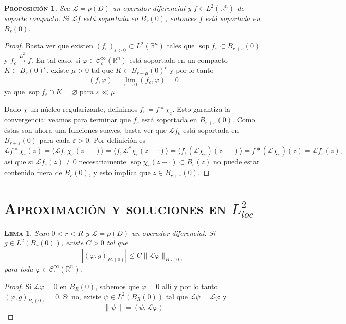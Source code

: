 \documentclass[11pt]{article}
\theoremstyle{colored}
\DeclareMathOperator{\sop}{sop}
\newtheorem{proposition}{\scshape Proposición}
\newtheorem{lemma}{\scshape Lema}
\newcommand{\R}{\mathbb{R}}
\newcommand{\C}{\mathscr{C}}
\newcommand{\eps}{\varepsilon}
\newcommand{\ev}[1]{\langle #1 \rangle}
\renewcommand{\L}{\mathscr{L}}
\begin{document}
\begin{proposition}Sea $\L = p(D)$ un operador diferencial y $f \in L^2(\R^n)$ de soporte compacto. Si $\L f$ está soportada en $B_r(0)$, entonces $f$ está soportada en $B_r(0)$.
\end{proposition}
\begin{proof} Basta ver que existen $(f_\eps)_{\eps > 0} \subset L^2(\R^n)$ tales que $\sop f_\eps \subset B_{r+\eps}(0)$ y $f_\eps \xrightarrow{L^2} f$. En tal caso, si $\varphi \in \C_c^\infty(\R^n)$ está soportada en un compacto $K \subset B_r(0)^c$, existe $\mu > 0$ tal que $K \subset B_{r+\mu}(0)^c$ y por lo tanto
\[
(f,\varphi) = \lim_{\eps \to 0}(f_\eps,\varphi) = 0
\]
ya que $\sop f_\eps \cap K = \varnothing$ para $\eps \ll \mu$.

Dado $\chi$ un núcleo regularizante, definimos $f_\eps = f \ast \chi_\eps$. Esto garantiza la convergencia: veamos para terminar que $f_\eps$ está soportada en $B_{r+\eps}(0)$. Como éstas son ahora una funciones suaves, basta ver que $\L f_\eps$ está soportada en $B_{r+\eps}(0)$ para cada $\eps >0$. Por definición es
\[
\L f \ast \chi_\eps(z) = \ev{\L f,\chi_\eps(z-\cdot)} = \ev{f,\L^\ast\chi_\eps(z-\cdot)} = \ev{f,(\L\chi_\eps)(z-\cdot)} = f \ast (\L \chi_\eps
)(z) = \L f_\eps(z),
\]
así que si $\L f_\eps(z) \neq 0$ necesariamente $\sop \chi_\eps(z - \cdot) \subset B_\eps(z)$ no puede estar contenido fuera de $B_r(0)$, y esto implica que $z \in B_{r+\eps}(0)$.

\end{proof}

\section{\scshape Aproximación y soluciones en $L^2_{loc}$}

\begin{lemma} \label{lema-cota-lp-r-R}Sean $0 < r < R$ y $\L = p(D)$ un operador diferencial. Si $g \in L^2(B_r(0))$, existe $C > 0$ tal que
\[
|(\varphi,g)_{B_r(0)}| \leq C\|\L \varphi\|_{B_R(0)}
\]
para toda $\varphi \in \C_c^\infty(\R^n)$.
\end{lemma}
\begin{proof} Si $\L \varphi = 0$ en $B_R(0)$, sabemos que $\varphi = 0$ allí y por lo tanto $(\varphi,g)_{B_r(0)} = 0$. Si no, existe $\psi \in L^2(B_R(0))$ tal que $\L \psi = \L \varphi$ y 
\[
\|\psi\| = (\psi,\L \varphi)
\]
\end{proof}
\end{document}
